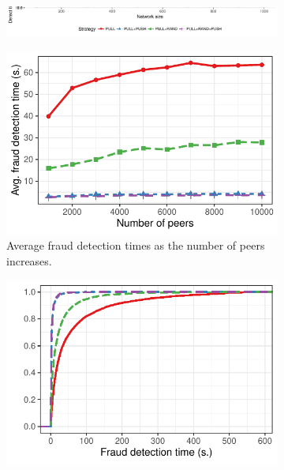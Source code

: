 \begin{figure}[t]
	\centering
	\begin{subfigure}{.8\columnwidth}
		\centering
		\includegraphics[width=.8\linewidth]{trustchain/assets/fraud_experiments_legend}
	\end{subfigure}
	\begin{subfigure}{.5\columnwidth}
		\centering
		\captionsetup{width=.9\linewidth}
		\includegraphics[width=\linewidth]{trustchain/assets/fraud_times_scalability}
		\caption{Average fraud detection times as the number of peers increases.}
		\label{fig:experiment_scalability_detection_times}
	\end{subfigure}%
	\begin{subfigure}{.5\columnwidth}
		\centering
		\captionsetup{width=.9\linewidth}
		\includegraphics[width=\columnwidth]{trustchain/assets/fraud_times_scalability_5000_ecdf}

\end{subfigure}
\end{figure}

